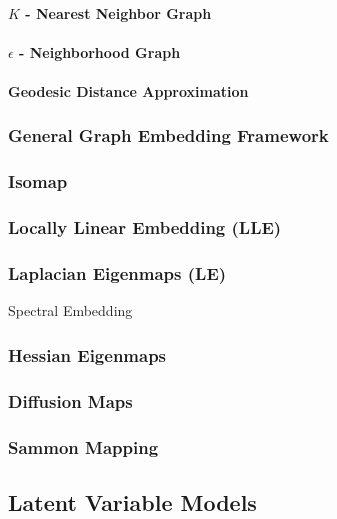 \paragraph{$K$ - Nearest Neighbor Graph}

\paragraph{$\epsilon$ - Neighborhood Graph}

\paragraph{Geodesic Distance Approximation}

\subsubsection{General Graph Embedding Framework}

\subsubsection{Isomap}

\subsubsection{Locally Linear Embedding (LLE)}

\subsubsection{Laplacian Eigenmaps (LE)}
Spectral Embedding

\subsubsection{Hessian Eigenmaps}

\subsubsection{Diffusion Maps}

\subsubsection{Sammon Mapping}

\subsection{Latent Variable Models}

